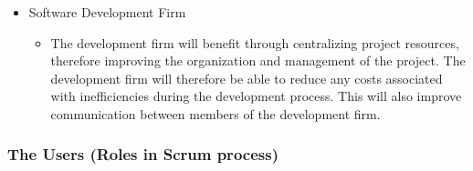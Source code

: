 \documentclass[12pt, titlepage]{article}
\begin{document}
\begin{itemize}
    \item Software Development Firm
    \begin{itemize}
      \item[] The development firm will benefit through centralizing project resources, therefore improving the organization and management of the project. The development firm will therefore be able to reduce any costs associated with inefficiencies during the development process. This will also improve communication between members of the development firm.
    \end{itemize}
\end{itemize}
\subsubsection{The Users (Roles in Scrum process)}
\end{document}
